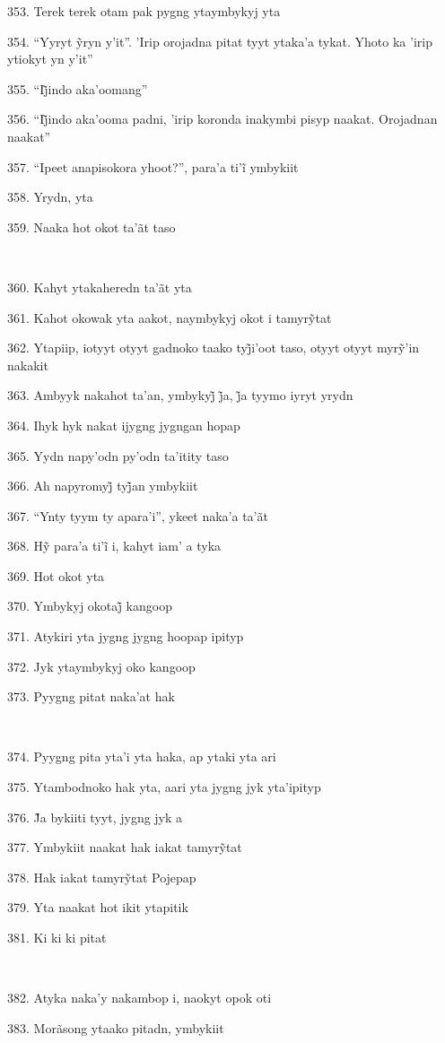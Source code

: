 353. Terek terek otam pak pygng ytaymbykyj yta

354. ``Yyryt ỹryn y’it''. ’Irip orojadna pitat tyyt ytaka’a tykat. Yhoto ka ’irip ytiokyt yn y’it''

355. ``Ij̃indo aka’oomang''

356. ``Ij̃indo aka’ooma padni, ’irip koronda inakymbi pisyp naakat. Orojadnan naakat''

357. ``Ipeet anapisokora yhoot?'', para’a ti’ĩ ymbykiit

358. Yrydn, yta

359. Naaka hot okot ta'ãt taso

~

360. Kahyt ytakaheredn ta'ãt yta

361. Kahot okowak yta aakot, naymbykyj okot i tamyrỹtat

362. Ytapiip, iotyyt otyyt gadnoko taako tyj̃i’oot taso, otyyt otyyt myrỹ’in nakakit

363. Ambyyk nakahot ta’an, ymbykyj̃ j̃a, j̃a tyymo iyryt yrydn

364. Ihyk hyk nakat ijygng jygngan hopap

365. Yydn napy'odn py'odn ta'itity taso

366. Ah napyromyj̃ tyj̃an ymbykiit

367. ``Ynty tyym ty apara'i'', ykeet naka'a ta'ãt

368. Hỹ para’a ti’ĩ i, kahyt iam’ a tyka

369. Hot okot yta

370. Ymbykyj okotaj̃ kangoop

371. Atykiri yta jygng jygng hoopap ipityp

372. Jyk ytaymbykyj oko kangoop

373. Pyygng pitat naka'at hak

~

374. Pyygng pita yta'i yta haka, ap ytaki yta ari

375. Ytambodnoko hak yta, aari yta jygng jyk yta'ipityp

376. J̃a bykiiti tyyt, jygng jyk a

377. Ymbykiit naakat hak iakat tamyrỹtat

378. Hak iakat tamyrỹtat Pojepap

379. Yta naakat hot ikit ytapitik

381. Ki ki ki pitat

~

382. Atyka naka'y nakambop i, naokyt opok oti

383. Morãsong ytaako pitadn, ymbykiit

